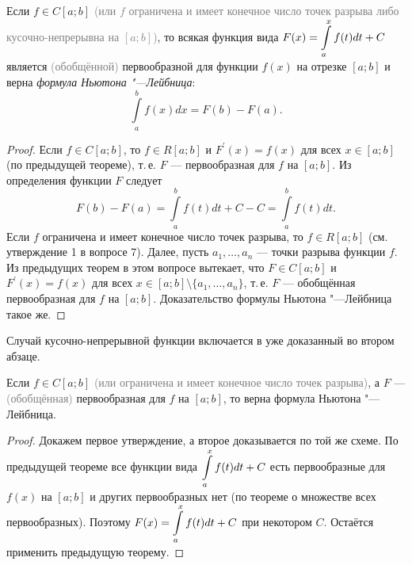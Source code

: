\begin{theorem}
    Если $f \in C[a; b]$ \textcolor{gray}{(или $f$ ограничена и имеет конечное число точек разрыва либо кусочно-непрерывна на $[a; b]$)}, то всякая функция вида $\displaystyle F(x) = \int\limits_a^xf(t)dt + C$ является \textcolor{gray}{(обобщённой)} первообразной для функции $f(x)$ на отрезке $[a; b]$ и верна \textit{формула Ньютона "---Лейбница}:
    \[
        \int\limits_a^bf(x)dx = F(b) - F(a).
    \]
\end{theorem}

\begin{proof}
    Если $f \in C[a; b]$, то $f \in R[a; b]$ и $F^\prime(x) = f(x)$ для всех $x \in [a; b]$ (по предыдущей теореме), т.\,е. $F$ --- первообразная для $f$ на $[a; b]$. Из определения функции $F$ следует
    \[
        F(b) - F(a) = \int\limits_a^bf(t)dt + C - C = \int\limits_a^bf(t)dt.
    \]
    Если $f$ ограничена и имеет конечное число точек разрыва, то $f \in R[a; b]$ (см. утверждение 1 в вопросе 7). Далее, пусть $a_1, \ldots, a_n$ --- точки разрыва функции $f$. Из предыдущих теорем в этом вопросе вытекает, что $F \in C[a; b]$ и $F^\prime(x) = f(x)$ для всех $x \in [a; b] \setminus \{a_1, \ldots, a_n\}$, т.\,е. $F$ --- обобщённая первообразная для $f$ на $[a; b]$. Доказательство формулы Ньютона "---Лейбница такое же.
\end{proof}

\begin{remark}
    Случай кусочно-непрерывной функции включается в уже доказанный во втором абзаце.
\end{remark}

\begin{theorem}
    Если $f \in C[a; b]$ \textcolor{gray}{(или ограничена и имеет конечное число точек разрыва)}, а $F$ --- \textcolor{gray}{(обобщённая)} первообразная для $f$ на $[a; b]$, то верна формула Ньютона "---Лейбница.
\end{theorem}

\begin{proof}
    Докажем первое утверждение, а второе доказывается по той же схеме. По предыдущей теореме все функции вида $\displaystyle\int\limits_a^xf(t)dt + C$ есть первообразные для $f(x)$ на $[a; b]$ и других первообразных нет (по теореме о множестве всех первообразных). Поэтому $\displaystyle F(x) = \int\limits_a^xf(t)dt + C$ при некотором $C$. Остаётся применить предыдущую теорему.
\end{proof}

